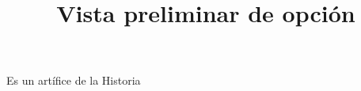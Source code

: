 \documentclass[a4paper,10pt]{article}\usepackage[utf8]{inputenc}\usepackage[spanish]{babel}\usepackage{times}
\title{Vista preliminar de opción}
\begin{document}
\twocolumn 

\maketitle

Es un artífice de la Historia
\end{document}
